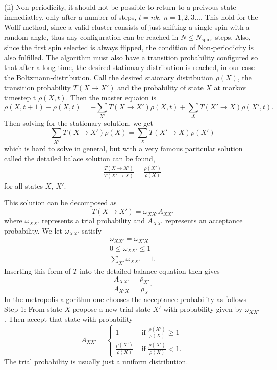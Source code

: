 \documentclass[a4paper]{article}
\newcommand{\trm}[1]{\textrm{#1}}
\newcommand{\oxx}{\omega_{XX'}}
\begin{document}
(ii) Non-periodicity, it should not be possible to return to a preivous state immediatley, only after a number of steps, $t =nk,~ n = 1,2,3\dots$.
This hold for the Wolff method, since a valid cluster consists of just shifting a single spin with a random angle, thus any configuration can be reached in $N \leq N_{\trm{spins}}$ steps. Also, since the first spin selected is always flipped, the condition of Non-periodicity is also fulfilled.
The algorithm must also have a transition probability configured so that after a long time, the desired stationary distribution is reached, in our case the Boltzmann-distribution.
Call the desired staionary distribution $\rho(X)$, the transition probability $T(X \rightarrow X')$ and the probability of state $X$ at markov timestep t $\rho(X,t)$.
Then the master equaion is 
\begin{equation}
  \rho(X, t+1) - \rho(X,t) = -\sum_{X'} T(X\rightarrow X')\rho(X,t) +\sum_{X} T(X'\rightarrow X)\rho(X',t).
\end{equation}
Then solving for the stationary solution, we get
\begin{equation}
  \sum_{X'}T(X\rightarrow X') \rho(X) =  \sum_{X}T(X'\rightarrow X) \rho(X')
  \label{}
\end{equation}
which is hard to solve in general, but with a very famous paritcular solution called the detailed balace solution can be found,
\begin{align}
  \frac{T(X\rightarrow X')}{T(X'\rightarrow X)} = \frac{\rho(X')}{\rho(X)} 
  \label{eq:detbal}
\end{align}
for all states $X,~X'$.

This solution can be decomposed as
\begin{equation}
  T(X\rightarrow X') = \omega_{XX'} A_{XX'}
  \label{}
\end{equation}
where $\oxx$ represents a trial probability and $A_{XX'}$ represents an acceptance probability.
We let $\omega_{XX'}$ satisfy
\begin{align}
  \oxx = \omega_{X'X}\\
  0 \leq \oxx \leq 1\\
  \sum_{X'} \oxx = 1.
  \label{}
\end{align}
Inserting this form of $T$ into the detailed balance equation then gives
\begin{equation}
  \frac{A_{XX'}}{A_{X'X}} = \frac{\rho_{X'}}{\rho_{X}}.
\end{equation}
In the metropolis algorithm one chooses the acceptance probability as follows
Step 1: From state $X$ propose a new trial state $X'$ with probability given by $\oxx$. Then accept that state with probability 
\begin{equation}
  A_{XX'} = 
  \begin{cases}
    	1 &\trm{ if } \frac{\rho(X')}{\rho(X)} \geq 1\\
	\frac{\rho(X')}{\rho(X)}&\trm{ if } \frac{\rho(X')}{\rho(X)} < 1 .
  \end{cases}
\end{equation}
The trial probability is usually just a uniform distribution.
\end{document}
